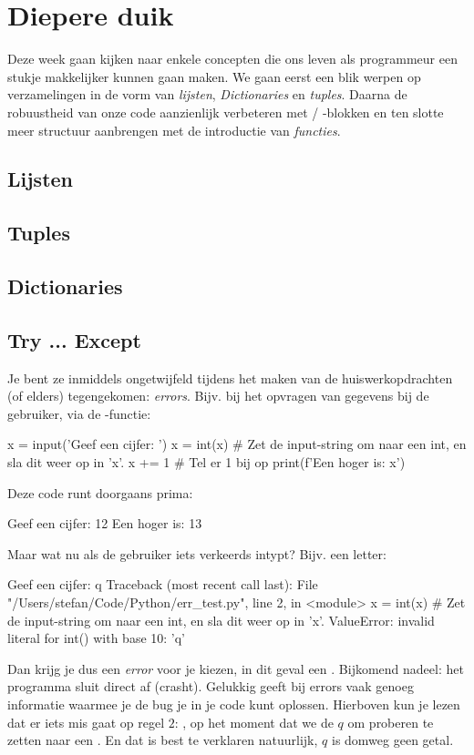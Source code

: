 \chapter{Diepere duik}
Deze week gaan kijken naar enkele concepten die ons leven als programmeur een stukje makkelijker kunnen gaan maken. We gaan eerst een blik werpen op verzamelingen in de vorm van \textit{lijsten}, \textit{Dictionaries} en \textit{tuples}. Daarna de robuustheid van onze code aanzienlijk verbeteren met  / -blokken en ten slotte meer structuur aanbrengen met de introductie van \textit{functies}. 

\section{Lijsten}


\section{Tuples}

\section{Dictionaries}

\section{Try ... Except}
Je bent ze inmiddels ongetwijfeld tijdens het maken van de huiswerkopdrachten (of elders) tegengekomen: \textit{errors}. Bijv. bij het opvragen van gegevens bij de gebruiker, via de -functie:
\begin{python}
x = input('Geef een cijfer: ')
x = int(x)  # Zet de input-string om naar een int, en sla dit weer op in 'x'.
x += 1  # Tel er 1 bij op
print(f'Een hoger is: {x}')
\end{python}
Deze code runt doorgaans prima:
\begin{python}
Geef een cijfer: 12
Een hoger is: 13
\end{python}
Maar wat nu als de gebruiker iets verkeerds intypt? Bijv. een letter:
\begin{python}
Geef een cijfer: q
Traceback (most recent call last):
  File "/Users/stefan/Code/Python/err_test.py", line 2, in <module>
    x = int(x)  # Zet de input-string om naar een int, en sla dit weer op in 'x'.
ValueError: invalid literal for int() with base 10: 'q'
\end{python}
Dan krijg je dus een \textit{error} voor je kiezen, in dit geval een . Bijkomend nadeel: het programma sluit direct af (crasht). Gelukkig geeft  bij errors vaak genoeg informatie waarmee je de bug je in je code kunt oplossen. Hierboven kun je lezen dat er iets mis gaat op regel $2$: , op het moment dat we de  $q$ om proberen te zetten naar een . En dat is best te verklaren natuurlijk, $q$ is domweg geen getal. 

